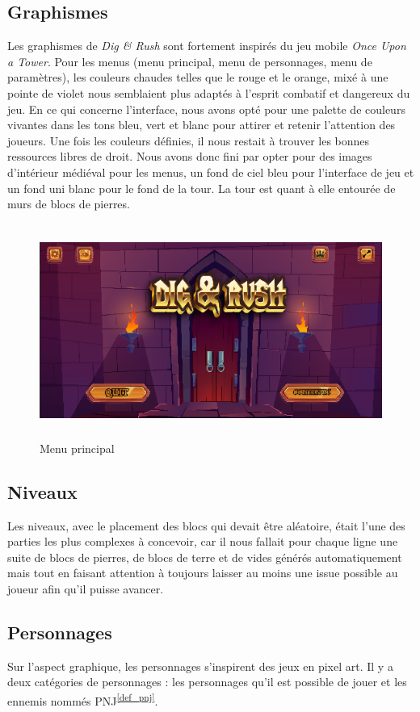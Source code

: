 \documentclass[a4paper,12pt]{article}
\newcommand\refsuscrite[1]{\textsuperscript{\ref{#1}}}
\begin{document}
\subsection{Graphismes}
Les graphismes de \textit{Dig \& Rush} sont fortement inspirés du jeu mobile \textit{Once Upon a Tower}.
Pour les menus (menu principal, menu de personnages, menu de paramètres), les couleurs  chaudes telles que le rouge et le orange, mixé à une pointe de violet nous semblaient plus adaptés à l'esprit combatif et dangereux du jeu. 
En ce qui concerne l'interface, nous avons opté pour une palette de couleurs vivantes dans les tons bleu, vert et blanc pour attirer et retenir l'attention des joueurs.
Une fois les couleurs définies, il nous restait à trouver les bonnes ressources libres de droit. Nous avons donc fini par opter pour des images d'intérieur médiéval pour les menus, un fond de ciel bleu pour l'interface de jeu et un fond uni blanc pour le fond de la tour.
La tour est quant à elle entourée de murs de blocs de pierres.
\begin{figure}[h]
	\centering
	\includegraphics[height=7cm]{img/menu.png}
	\caption{Menu principal}
	\label{menu}
\end{figure}

\subsection{Niveaux}
Les niveaux, avec le placement des blocs qui devait être aléatoire, était l'une des parties les plus complexes à concevoir, car il nous fallait pour chaque ligne une suite de blocs de pierres, de blocs de terre et de vides générés automatiquement mais tout en faisant attention à toujours laisser au moins une issue possible au joueur afin qu'il puisse avancer.

\subsection{Personnages}
Sur l’aspect graphique, les personnages s’inspirent des jeux en pixel art. 
Il y a deux catégories de personnages : les personnages qu’il est possible de jouer et les ennemis nommés PNJ\refsuscrite{def_pnj}.
\end{document}
